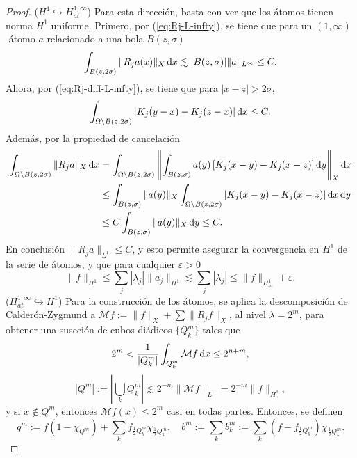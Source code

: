 \begin{proof}
	($H^1 \hookrightarrow H^{1,\infty}_{at}$) Para esta dirección, basta con ver que los átomos tienen norma $H^1$ uniforme. Primero, por (\ref{eq:Rj-L-infty}), se tiene que para un $(1,\infty)$-átomo $a$ relacionado a una bola $B(z, \sigma)$
	\begin{equation*}
		\int_{B(z, 2\sigma)}\|R_j a(x) \|_X\mathop{}\!\mathrm{d} x \lesssim |B(z, \sigma)|\|a\|_{L^\infty} \leq C.
	\end{equation*}
	Ahora, por (\ref{eq:Rj-diff-L-infty}), se tiene que para $|x-z|>2\sigma$, 
	\begin{equation*}
		\int_{\Omega\setminus B(z, 2\sigma)} |K_j(y-x) - K_j(z-x)|\mathop{}\!\mathrm{d} x \leq C.
	\end{equation*}
	Además, por la propiedad de cancelación
	\begin{align*}
		\int_{\Omega\setminus B(z, 2\sigma)} \|R_ja\|_X\mathop{}\!\mathrm{d} x & = \int_{\Omega\setminus B(z, 2\sigma)} \left\| \int_{B(z, \sigma)} a(y)  \left[ K_j(x - y)- K_j(x - z) \right] \mathop{}\!\mathrm{d} y
		\right\|_X \mathop{}\!\mathrm{d} x \\
		& \leq  \int_{B(z, \sigma)}\|a(y)\|_X \int_{\Omega\setminus B(z, 2\sigma)} |K_j(x - y)- K_j(x - z)| \mathop{}\!\mathrm{d} x \mathop{}\!\mathrm{d} y \\
		& \leq C \int_{B(z, \sigma)}\|a(y)\|_X \mathop{}\!\mathrm{d} y \leq C.
	\end{align*}
	En conclusión $\|R_j a\|_{L^1} \leq C$, y esto permite asegurar la convergencia en $H^1$ de la serie de átomos, y que  para cualquier $\varepsilon>0$
	\begin{equation*}
		\|f\|_{H^1}  \leq \sum_j |\lambda_j| \|a_j\|_{H^1} \lesssim \sum_j |\lambda_j| \leq \|f\|_{H^1_{at}} + \varepsilon.
	\end{equation*}
	($H^{1,\infty}_{at}\hookrightarrow H^1$) Para la construcción de los átomos,  se aplica la descomposición de Calderón-Zygmund a $\mathcal{M}f:= \|f\|_X + \sum \|R_jf\|_X$, al nivel $\lambda=2^m$, para obtener una suseción de cubos diádicos $\{Q_k^m\}$ tales que 
	\begin{equation*}
		2^m < \frac{1}{|Q_k^m|}\int_{Q_k^m} \mathcal{M}f\mathop{}\!\mathrm{d} x \leq 2^{n+m},
	\end{equation*}
	\begin{equation*}
		|Q^m| := \left|\bigcup_k Q_k^m\right| \lesssim 2^{-m}\|\mathcal{M}f\| _{L^1}= 2^{-m}\|f\|_{H^1},
	\end{equation*}
	y si $x\notin Q^m$, entonces $\mathcal{M}f(x) \leq 2^m$ casi en todas partes. Entonces, se definen 
	\begin{equation*}
		g^m := f(1-\chi_{Q^m}) + \sum_k f_{\frac{1}{2}Q_k^m}\chi_{\frac{1}{2}Q_k^m}, \quad b^m := \sum_k b_k^m := \sum_k (f-f_{\frac{1}{2}Q_k^m})\chi_{\frac{1}{2}Q_k^m}.

\end{equation*}
\end{proof}
